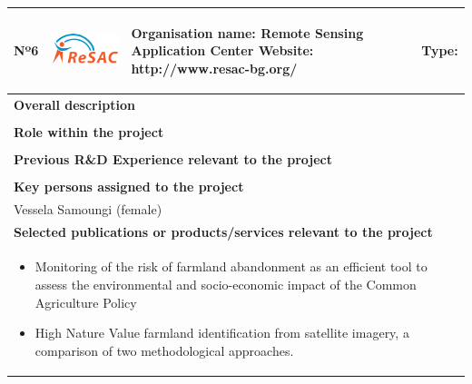 \begin{longtable}[H]{|p{0.7cm}|p{4cm}|p{7cm}|p{1.3cm}|}
	\hline
	\begin{center} Nº6 \end{center} & \begin{center} \includegraphics[scale=1.2]{./logos/logo_resac} \end{center} & \begin{center} \textbf{Organisation name:} Remote Sensing Application Center \newline \textbf{Website:} http://www.resac-bg.org/ \end{center} & \begin{center} Type: \end{center} \\ \hline
	
	\multicolumn{4}{|p{13cm}|}{\textbf{Overall description}}  \\ \hline
	
	\multicolumn{4}{|p{14.5cm}|}{}  \\ \hline
	
	\multicolumn{4}{|p{13cm}|}{\textbf{Role within the project}}   \\ \hline
	
	\multicolumn{4}{|p{14.5cm}|}{}  \\ \hline
	
	\multicolumn{4}{|p{13cm}|}{\textbf{Previous R\&D Experience relevant to the project}}  \\ \hline
	
	\multicolumn{4}{|p{14.5cm}|}{}  \\ \hline
	
	\multicolumn{4}{|p{13cm}|}{\textbf{Key persons assigned to the project}}   \\ \hline
	
	\multicolumn{4}{|p{14.5cm}|}{Vessela Samoungi (female) }  \\ \hline
	
	\multicolumn{4}{|p{13cm}|}{\textbf{Selected publications or products/services relevant to the project}}  \\ \hline
	
	\multicolumn{4}{|p{14.5cm}|}{
		\begin{itemize}
			\item  Monitoring of the risk of farmland abandonment as an efficient tool to assess the environmental and socio-economic impact of the Common Agriculture Policy
			\item High Nature Value farmland identification from satellite imagery, a comparison of two methodological approaches.
		\end{itemize}	
      }  \\ \hline
	

\end{longtable}
